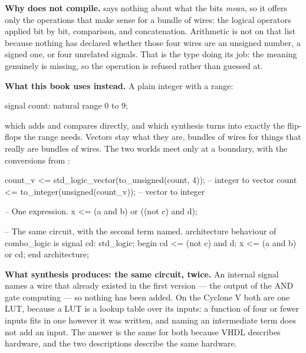 \textbf{Why  does not compile.}  says nothing about what the
bits \emph{mean}, so it offers only the operations that make sense for a bundle of wires: the
logical operators applied bit by bit, comparison, and concatenation. Arithmetic is not on that list
because nothing has declared whether those four wires are an unsigned number, a signed one, or four
unrelated signals. That is the type doing its job: the meaning genuinely is missing, so the
operation is refused rather than guessed at. 

\textbf{What this book uses instead.} A plain integer with a range:

\begin{vhdlcode}
signal count: natural range 0 to 9;
\end{vhdlcode}

\noindent which adds and compares directly, and which synthesis turns into exactly the flip-flops
the range needs. Vectors stay what they are, bundles of wires for things that really are bundles of
wires. The two worlds meet only at a boundary, with the conversions from :

\begin{vhdlcode}
count_v <= std_logic_vector(to_unsigned(count, 4));   -- integer to vector
count   <= to_integer(unsigned(count_v));             -- vector to integer
\end{vhdlcode}
\noindent{}

\begin{vhdlcode}
-- One expression.
x <= (a and b) or ((not c) and d);
\end{vhdlcode}

\begin{vhdlcode}
-- The same circuit, with the second term named.
architecture behaviour of combo_logic is
signal cd: std_logic;
begin
    cd <= (not c) and d;
    x  <= (a and b) or cd;
end architecture;
\end{vhdlcode}

\textbf{What synthesis produces: the same circuit, twice.} An internal signal names a wire that
already existed in the first version --- the output of the AND gate computing  --- so
nothing has been added. On the Cyclone V both are one LUT, because a LUT is a lookup table over its
inputs: a function of four or fewer inputs fits in one however it was written, and naming an
intermediate term does not add an input. The answer is the same for both because VHDL describes
hardware, and the two descriptions describe the same hardware.


